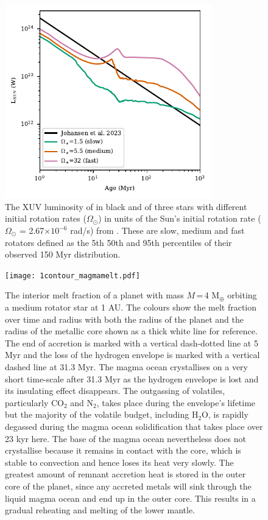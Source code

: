 \documentclass[bibyear,tradiabstract]{aa}
\begin{document}
\begin{figure}
\centering
\includegraphics[width=9cm]{LXUV_Johnstone.pdf}
   \caption{The XUV luminosity of \cite{Johansen+2023I} in black and of three stars with different initial rotation rates ($\Omega_{\odot}$) in units of the Sun's initial rotation rate ($\Omega_{\odot}$ = 2.67$\times10^{-6}$ rad/s) from \cite{Johnstone+2021}. These are slow, medium and fast rotators defined as the 5th 50th and 95th percentiles of their observed 150 Myr distribution.
           }
      \label{Fig:XUV}
\end{figure}
\begin{figure}
\centering
\texttt{[image: 1contour\_magmamelt.pdf]}
   \caption{The interior melt fraction of a planet with mass $M$\,=\,4 M$_{\oplus}$ orbiting a medium rotator star at 1 AU. The colours show the melt fraction over time and radius with both the radius of the planet and the radius of the metallic core shown as a thick white line for reference. The end of accretion is marked with a vertical dash-dotted line at 5 Myr and the loss of the hydrogen envelope is marked with a vertical dashed line at 31.3 Myr. The magma ocean crystallises on a very short time-scale after 31.3 Myr as the hydrogen envelope is lost and its insulating effect disappears.{ The outgassing of volatiles, particularly CO$_2$ and N$_2$, takes place during the envelope's lifetime but the majority of the volatile budget, including H$_2$O, is rapidly degassed during the magma ocean solidification that takes place over 23 kyr here.} The base of the magma ocean nevertheless does not crystallise because it remains in contact with the core, which is stable to convection and hence loses its heat very slowly. The greatest amount of remnant accretion heat is stored in the outer core of the planet, since any accreted metals will sink through the liquid magma ocean and end up in the outer core. This results in a gradual reheating and melting of the lower mantle.
           }
      \label{Fig:meltfrac}
\end{figure}
\end{document}
